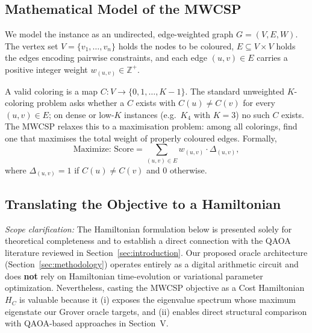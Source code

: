 \documentclass{ieeeaccess}
\begin{document}
\subsection{Mathematical Model of the MWCSP}

We model the instance as an undirected, edge-weighted graph $G = (V, E, W)$. The vertex set $V = \{v_1, \dots, v_n\}$ holds the nodes to be coloured, $E \subseteq V \times V$ holds the edges encoding pairwise constraints, and each edge $(u, v) \in E$ carries a positive integer weight $w_{(u,v)} \in \mathbb{Z}^+$.

A valid coloring is a map $C: V \to \{0, 1, \dots, K-1\}$. The standard unweighted $K$-coloring problem asks whether a $C$ exists with $C(u) \neq C(v)$ for every $(u,v) \in E$; on dense or low-$K$ instances (e.g.\ $K_4$ with $K=3$) no such $C$ exists. The MWCSP relaxes this to a maximisation problem: among all colorings, find one that maximises the total weight of properly coloured edges. Formally,
\begin{equation}
\text{Maximize: } \text{Score} = \sum_{(u, v) \in E} w_{(u,v)} \cdot \Delta_{(u,v)},
\end{equation}
where $\Delta_{(u,v)} = 1$ if $C(u) \neq C(v)$ and $0$ otherwise.

\subsection{Translating the Objective to a Hamiltonian}
\textit{Scope clarification:} The Hamiltonian formulation below is presented solely for theoretical completeness and to establish a direct connection with the QAOA literature reviewed in Section~\ref{sec:introduction}. Our proposed oracle architecture (Section~\ref{sec:methodology}) operates entirely as a digital arithmetic circuit and does \textbf{not} rely on Hamiltonian time-evolution or variational parameter optimization. Nevertheless, casting the MWCSP objective as a Cost Hamiltonian $H_C$ is valuable because it (i) exposes the eigenvalue spectrum whose maximum eigenstate our Grover oracle targets, and (ii) enables direct structural comparison with QAOA-based approaches in Section~V.
\end{document}
